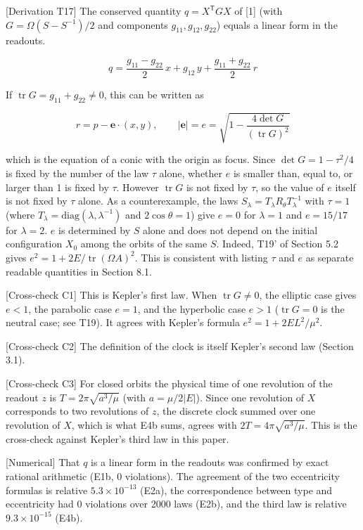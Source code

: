 \documentclass[
  a4paper,
]{article}
\begin{document}
{[}Derivation T17{]} The conserved quantity \(q=X^{\mathsf T}GX\) of
{[}1{]} (with \(G=\Omega(S-S^{-1})/2\) and components
\(g_{11},g_{12},g_{22}\)) equals a linear form in the readouts.

\[
\boxed{\;q=\frac{g_{11}-g_{22}}{2}\,x+g_{12}\,y+\frac{g_{11}+g_{22}}{2}\,r\;}
\]

If \(\operatorname{tr}G=g_{11}+g_{22}\neq0\), this can be written as

\[
r=p-\mathbf e\cdot(x,y),\qquad \lvert\mathbf e\rvert=e=\sqrt{1-\frac{4\det G}{(\operatorname{tr}G)^2}}
\]

which is the equation of a conic with the origin as focus. Since
\(\det G=1-\tau^2/4\) is fixed by the number of the law \(\tau\) alone,
whether \(e\) is smaller than, equal to, or larger than 1 is fixed by
\(\tau\). However \(\operatorname{tr}G\) is not fixed by \(\tau\), so
the value of \(e\) itself is not fixed by \(\tau\) alone. As a
counterexample, the laws \(S_\lambda=T_\lambda R_\theta T_\lambda^{-1}\)
with \(\tau=1\) (where \(T_\lambda=\mathrm{diag}(\lambda,\lambda^{-1})\)
and \(2\cos\theta=1\)) give \(e=0\) for \(\lambda=1\) and \(e=15/17\)
for \(\lambda=2\). \(e\) is determined by \(S\) alone and does not
depend on the initial configuration \(X_0\) among the orbits of the same
\(S\). Indeed, T19' of Section 5.2 gives
\(e^2=1+2E/\operatorname{tr}(\Omega A)^2\). This is consistent with
listing \(\tau\) and \(e\) as separate readable quantities in Section
8.1.

{[}Cross-check C1{]} This is Kepler's first law. When
\(\operatorname{tr}G\neq0\), the elliptic case gives \(e<1\), the
parabolic case \(e=1\), and the hyperbolic case \(e>1\)
(\(\operatorname{tr}G=0\) is the neutral case; see T19). It agrees with
Kepler's formula \(e^2=1+2EL^2/\mu^2\).

{[}Cross-check C2{]} The definition of the clock is itself Kepler's
second law (Section 3.1).

{[}Cross-check C3{]} For closed orbits the physical time of one
revolution of the readout \(z\) is \(T=2\pi\sqrt{a^3/\mu}\) (with
\(a=\mu/2\lvert E\rvert\)). Since one revolution of \(X\) corresponds to
two revolutions of \(z\), the discrete clock summed over one revolution
of \(X\), which is what E4b sums, agrees with \(2T=4\pi\sqrt{a^3/\mu}\).
This is the cross-check against Kepler's third law in this paper.

{[}Numerical{]} That \(q\) is a linear form in the readouts was
confirmed by exact rational arithmetic (E1b, 0 violations). The
agreement of the two eccentricity formulas is relative
\(5.3\times10^{-13}\) (E2a), the correspondence between type and
eccentricity had 0 violations over 2000 laws (E2b), and the third law is
relative \(9.3\times10^{-15}\) (E4b).
\end{document}
